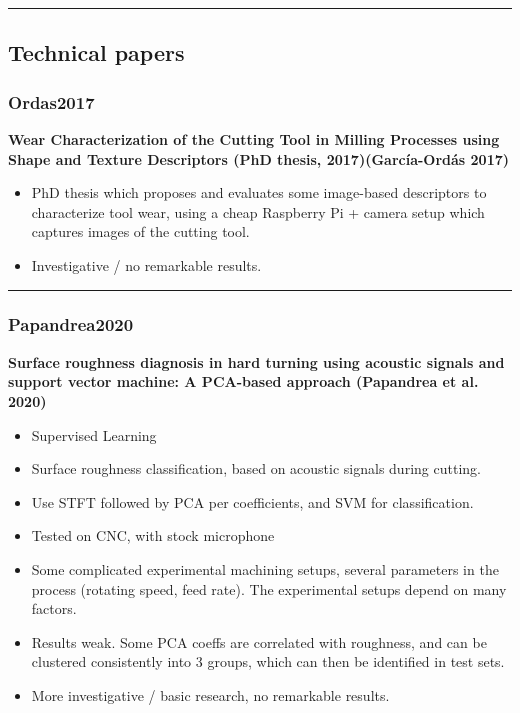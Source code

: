 \documentclass[
  letterpaper,
  DIV=11,
  numbers=noendperiod]{scrartcl}
\providecommand{\tightlist}{%
  \setlength{\itemsep}{0pt}\setlength{\parskip}{0pt}}\usepackage{longtable,booktabs,array}
\begin{document}
\begin{center}\rule{0.5\linewidth}{0.5pt}\end{center}

\hypertarget{technical-papers}{%
\subsection{Technical papers}\label{technical-papers}}

\hypertarget{ordas2017}{%
\subsubsection{Ordas2017}\label{ordas2017}}

\textbf{Wear Characterization of the Cutting Tool in Milling Processes
using Shape and Texture Descriptors (PhD thesis, 2017)(García-Ordás
2017)}

\begin{itemize}
\item
  PhD thesis which proposes and evaluates some image-based descriptors
  to characterize tool wear, using a cheap Raspberry Pi + camera setup
  which captures images of the cutting tool.
\item
  Investigative / no remarkable results.
\end{itemize}

\begin{center}\rule{0.5\linewidth}{0.5pt}\end{center}

\hypertarget{papandrea2020}{%
\subsubsection{Papandrea2020}\label{papandrea2020}}

\textbf{Surface roughness diagnosis in hard turning using acoustic
signals and support vector machine: A PCA-based approach (Papandrea et
al. 2020)}

\begin{itemize}
\tightlist
\item
  Supervised Learning
\item
  Surface roughness classification, based on acoustic signals during
  cutting.
\item
  Use STFT followed by PCA per coefficients, and SVM for classification.
\item
  Tested on CNC, with stock microphone
\item
  Some complicated experimental machining setups, several parameters in
  the process (rotating speed, feed rate). The experimental setups
  depend on many factors.
\item
  Results weak. Some PCA coeffs are correlated with roughness, and can
  be clustered consistently into 3 groups, which can then be identified
  in test sets.
\item
  More investigative / basic research, no remarkable results.
\end{itemize}
\end{document}
